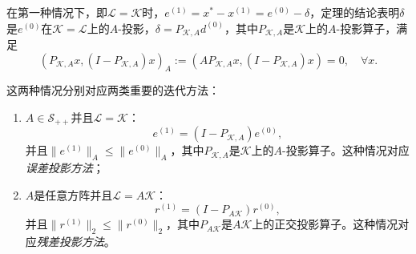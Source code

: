 \documentclass[a4paper,10pt]{ctexart}
\begin{document}
在第一种情况下，即$ \mathcal{L} = \mathcal{K} $时，$ e^{(1)} = x^* - x^{(1)} = e^{(0)} - \delta $，定理的结论表明$ \delta $是$ e^{(0)} $在$ \mathcal{K} = \mathcal{L} $上的$ A $-投影，$ \delta = P_{\mathcal{K},A} d^{(0)} $，其中$ P_{\mathcal{K},A} $是$ \mathcal{K} $上的$ A $-投影算子，满足
\[
    (P_{\mathcal{K}, A}x, (I-P_{\mathcal{K}, A})x)_A := (AP_{\mathcal{K}, A}x, (I-P_{\mathcal{K}, A})x) = 0,\quad \forall x.
\]

这两种情况分别对应两类重要的迭代方法：
\begin{enumerate}
    \item $ A\in \mathcal{S}_{++} $并且$ \mathcal{L} = \mathcal{K} $：
    \begin{equation}
        e^{(1)} = (I - P_{\mathcal{K}, A})e^{(0)},
    \end{equation}
    并且$ \| e^{(1)} \|_A \leqslant \| e^{(0)} \|_A $，其中$ P_{\mathcal{K}, A} $是$ \mathcal{K} $上的$ A $-投影算子。这种情况对应\emph{误差投影方法}；
    \item $ A $是任意方阵并且$ \mathcal{L} = A\mathcal{K} $：
    \begin{equation}
        r^{(1)} = (I - P_{A\mathcal{K}})r^{(0)},
    \end{equation}
    并且$ \| r^{(1)} \|_2 \leqslant \| r^{(0)} \|_2 $，其中$ P_{A\mathcal{K}} $是$ A\mathcal{K} $上的正交投影算子。这种情况对应\emph{残差投影方法}。
\end{enumerate}
\end{document}

